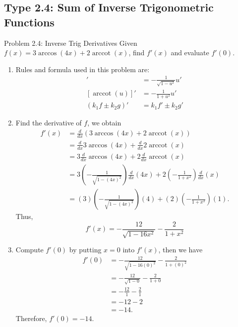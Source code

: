 \documentclass[11pt,a4paper]{article}
\begin{document}
\subsection{Type 2.4: Sum of Inverse Trigonometric Functions}
\begin{problembox}{Problem 2.4: Inverse Trig Derivatives}
Given $f(x) = 3\arccos(4x) + 2\operatorname{arccot}(x)$, find $f'(x)$ and evaluate $f'(0)$.
\end{problembox}
\begin{solutionbox}
\begin{enumerate}
	\item [Step 1.] Rules and formula used in this problem are:
	\begin{align*}
		[\arccos(u)]' &= -\frac{1}{\sqrt{1-u^2}} u' \\
		[\operatorname{arccot}(u)]' &= -\frac{1}{1+u^2} u' \\
		(k_1f \pm k_2 g)' &= k_1f' \pm k_2g'
	\end{align*}
	
	\item [Step 2.] Find the derivative of $f$, we obtain
	\begin{align*}
		f'(x) &= \frac{d}{dx} \left(3\arccos(4x) + 2\operatorname{arccot}(x)\right) \\
		&= \frac{d}{dx} 3\arccos(4x) + \frac{d}{dx} 2\operatorname{arccot}(x) \\
		&= 3 \frac{d}{dx} \arccos(4x) + 2 \frac{d}{dx} \operatorname{arccot}(x) \\
		&= 3\left(-\frac{1}{\sqrt{1-(4x)^2}}\right)\frac{d}{dx}(4x) + 2\left(-\frac{1}{1+x^2}\right)\frac{d}{dx}(x) \\
		&= (3)\left(-\frac{1}{\sqrt{1-(4x)^2}}\right)(4) + (2)\left(-\frac{1}{1+x^2}\right)(1).
	\end{align*}
	Thus,
	\begin{equation*}
		f'(x) = -\frac{12}{\sqrt{1-16x^2}} - \frac{2}{1+x^2}
	\end{equation*}
	
	\item [Step 3.] Compute $f'(0)$ by putting $x = 0$ into $f'(x)$, then we have
	\begin{align*}
		f'(0) &= -\frac{12}{\sqrt{1-16(0)^2}} - \frac{2}{1+(0)^2} \\
		&= -\frac{12}{\sqrt{1-0}} - \frac{2}{1+0} \\
		&= -\frac{12}{1} - \frac{2}{1} \\
		&= -12 - 2 \\
		&= -14.
	\end{align*}
	Therefore, $f'(0) = -14$.
	\end{enumerate}
\end{solutionbox}
\newpage
\end{document}
